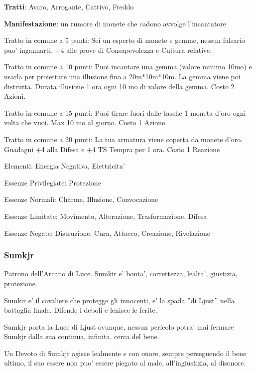 \documentclass[a4paper,11pt,twoside,openany]{book}
\begin{document}
{		\textbf{Tratti}: Avaro, Arrogante, Cattivo, Freddo
		
		\textbf{Manifestazione}: un rumore di monete che cadono avvolge l'incantatore
		
		\bigskip
		
		Tratto in comune a 5 punti: Sei un esperto di monete e gemme, nessun falsario puo' ingannarti. +4 alle prove di Consapevolezza e Cultura relative.
		
		Tratto in comune a 10 punti: Puoi incantare una gemma (valore minimo 10mo) e usarla per proiettare una illusione fino a 20m{*}10m{*}10m. La gemma viene poi distrutta. Durata illusione 1 ora ogni 10 mo di valore della gemma. Costo 2 Azioni.
		
		Tratto in comune a 15 punti: Puoi tirare fuori dalle tasche 1 moneta d'oro ogni volta che vuoi. Max 10 mo al giorno. Costo 1 Azione.
		
		Tratto in comune a 20 punti: La tua armatura viene coperta da monete d'oro. Guadagni +4 alla Difesa e +4 TS Tempra per 1 ora. Costo 1 Reazione 
		
		\bigskip
		
		Elementi: Energia Negativa, Elettricita'
		
		\bigskip
		
		Essenze Privilegiate: Protezione
		
		Essenze Normali: Charme, Illusione, Convocazione
		
		Essenze Limitate: Movimento, Alterazione, Trasformazione, Difesa
		
		Essenze Negate: Distruzione, Cura, Attacco, Creazione, Rivelazione
		
		\subsubsection{Sumkjr}
		
		\label{sumkjr}
		
		Patrono dell'Arcano di Luce. Sumkir e' bonta', correttezza, lealta', giustizia, protezione.
		
		Sumkir e' il cavaliere che protegge gli innocenti, e' la spada ''di Ljust'' nella battaglia finale. Difende i deboli e lenisce le ferite.
		
		Sumkjr porta la Luce di Ljust ovunque, nessun pericolo potra' mai fermare Sumkjr dalla sua continua, infinita, cerca del bene.
		
		Un Devoto di Sumkjr agisce lealmente e con onore, sempre perseguendo il bene ultimo, il suo essere non puo' essere piegato al male, all'ingiustizia, al disonore.
		
}
\end{document}
